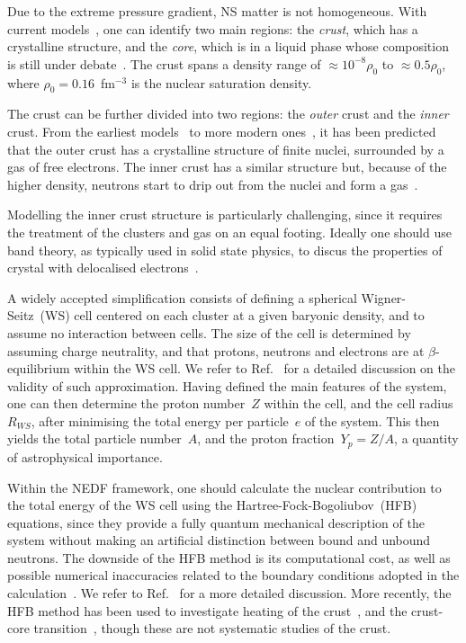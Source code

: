 \documentclass[
    amsmath,amssymb,
    aps,
    prc,
    floatfix,
]{revtex4-2}
\begin{document}
Due to the extreme pressure gradient, NS matter is not homogeneous. With current models~\cite{chamel2008physics}, one can identify two main regions: the \emph{crust}, which has a crystalline structure, and the \emph{core}, which is in a liquid phase whose composition is still under debate~\cite{lattimer2004physics, alford2007quark, chatterjee2016hyperons, vidana2018d, li2018competition}. The crust spans a density range of $\approx10^{-8}\rho_0$ to $\approx0.5\rho_0$, where $\rho_0=0.16$~fm$^{-3}$ is the nuclear saturation density.

The crust can be further divided into two regions: the \emph{outer} crust and the \emph{inner} crust. From the earliest models~\cite{baym1971ground} to more modern ones~\cite{pearsonPropertiesOuterCrust2011,chamelBinaryTernaryIonic2016}, it has been predicted that the outer crust has a crystalline structure of finite nuclei, surrounded by a gas of free electrons. The inner crust has a similar structure but, because of the higher density, neutrons start to drip out from the nuclei and form a gas~\cite{negele1973neutron, chamel2015neutron,pastore2020impact}.

Modelling the inner crust structure is particularly challenging, since it requires the treatment of the clusters and gas on an equal footing. Ideally one should use band theory, as typically used in solid state physics, to discus the properties of crystal with delocalised electrons~\cite{chamel2007validity, chamel2012neutron}.

A widely accepted simplification consists of defining a spherical Wigner-Seitz~(WS) cell centered on each cluster at a given baryonic density, and to assume no interaction between cells. The size of the cell is determined by assuming charge neutrality, and that protons, neutrons and electrons are at $\beta$-equilibrium within the WS cell. We refer to Ref.~\cite{chamel2007validity} for a detailed discussion on the validity of such approximation.
Having defined the main features of the system, one can then determine the proton number~$Z$ within the cell, and the cell radius~$R_{WS}$, after minimising the total energy per particle~$e$ of the system. This then yields the total particle number~$A$, and the proton fraction~$Y_p=Z/A$, a quantity of astrophysical importance.

Within the NEDF framework, one should calculate the nuclear contribution to the total energy of the WS cell using the Hartree-Fock-Bogoliubov~(HFB)~\cite{ring2004nuclear} equations, since they provide a fully quantum mechanical description of the system without making an artificial distinction between bound and unbound neutrons. The downside of the HFB method is its computational cost, as well as possible numerical inaccuracies related to the boundary conditions adopted in the calculation~\cite{baldo2006role,Margueron2007b,margueron2008equation,pastore2011superfluid}. We refer to Ref.~\cite{pastore2017new} for a more detailed discussion. More recently, the HFB method has been used to investigate heating of the crust~\cite{fantinaCrustalHeatingAccreting2018}, and the crust-core transition~\cite{schuetrumpfSurveyNuclearPasta2019}, though these are not systematic studies of the crust.
\end{document}
